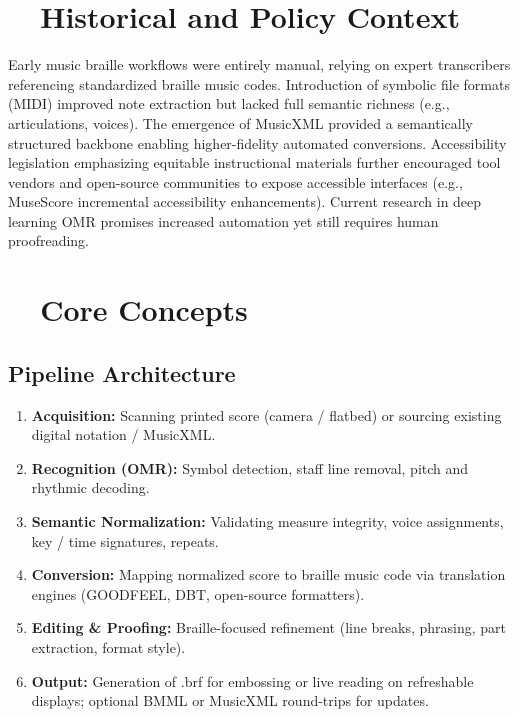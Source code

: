\section{~~Historical and Policy Context}\label{ch10:sec:history-policy}
Early music braille workflows were entirely manual, relying on expert transcribers referencing standardized braille music codes.\supercite{loc-braille-intervals} Introduction of symbolic file formats (MIDI) improved note extraction but lacked full semantic richness (e.g., articulations, voices). The emergence of \gls{MusicXML} provided a semantically structured backbone enabling higher-fidelity automated conversions.\supercite{daisy-musicxml} Accessibility legislation emphasizing equitable instructional materials further encouraged tool vendors and open-source communities to expose accessible interfaces (e.g., MuseScore incremental accessibility enhancements).\supercite{musescore-accessibility} Current research in deep learning \gls{OMR} promises increased automation yet still requires human proofreading.\supercite{sachindae-polyphonic-omr, GaetanBaert-OMRdeep}

\section{~~Core Concepts}\label{ch10:sec:core-concepts}
\subsection{Pipeline Architecture}
\begin{enumerate}
	\item \textbf{Acquisition:} Scanning printed score (camera / flatbed) or sourcing existing digital notation / \gls{MusicXML}.
	\item \textbf{Recognition (\gls{OMR}):} Symbol detection, staff line removal, pitch and rhythmic decoding.\supercite{researchgate-polyphonic-omr}
	\item \textbf{Semantic Normalization:} Validating measure integrity, voice assignments, key / time signatures, repeats.
	\item \textbf{Conversion:} Mapping normalized score to braille music code via translation engines (GOODFEEL, DBT, open-source formatters).\supercite{dancingdots-goodfeel, DuxburyDBT}
	\item \textbf{Editing \& Proofing:} Braille-focused refinement (line breaks, phrasing, part extraction, format style).
	\item \textbf{Output:} Generation of .brf for embossing\supercite{BRLFormat} or live reading on refreshable displays; optional BMML or \gls{MusicXML} round-trips for updates.
\end{enumerate}

